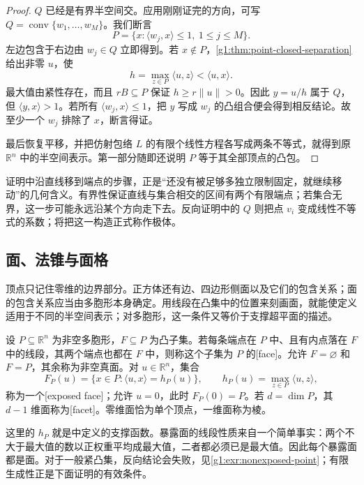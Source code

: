 \begin{proof}
	\(Q\) 已经是有界半空间交。应用刚刚证完的方向，可写 \(Q=\operatorname{conv}\{w_1,\ldots,w_M\}\)。我们断言
	\[
		P=\{x:\langle w_j,x\rangle\le1,\ 1\le j\le M\}.
	\]
	左边包含于右边由 \(w_j\in Q\) 立即得到。若 \(x\notin P\)，\cref{g1:thm:point-closed-separation}给出非零 \(u\)，使
	\[
		h=\max_{z\in P}\langle u,z\rangle<\langle u,x\rangle.
	\]
	最大值由紧性存在，而且 \(rB\subseteq P\) 保证 \(h\ge r\lVert u\rVert>0\)。因此 \(y=u/h\) 属于 \(Q\)，但 \(\langle y,x\rangle>1\)。若所有 \(\langle w_j,x\rangle\le1\)，把 \(y\) 写成 \(w_j\) 的凸组合便会得到相反结论。故至少一个 \(w_j\) 排除了 \(x\)，断言得证。

	最后恢复平移，并把仿射包络 \(L\) 的有限个线性方程各写成两条不等式，就得到原 \(\mathbb R^n\) 中的半空间表示。第一部分随即还说明 \(P\) 等于其全部顶点的凸包。
\end{proof}

证明中沿直线移到端点的步骤，正是“还没有被足够多独立限制固定，就继续移动”的几何含义。有界性保证直线与集合相交的区间有两个有限端点；若集合无界，这一步可能永远沿某个方向走下去。反向证明中的 \(Q\) 则把点 \(v_i\) 变成线性不等式的系数；将把这一构造正式称作极体。

\subsection{面、法锥与面格}
\label{g1:subsec:0303:03}

顶点只记住零维的边界部分。正方体还有边、四边形侧面以及它们的包含关系；面的包含关系应当由多胞形本身确定。用线段在凸集中的位置来刻画面，就能使定义适用于不同的半空间表示；对多胞形，这一条件又等价于支撑超平面的描述。

\begin{definition}
	\label{g1:def:polytope-face}
	设 \(P\subseteq\mathbb R^n\) 为非空多胞形，\(F\subseteq P\) 为凸子集。若每条端点在 \(P\) 中、且有内点落在 \(F\) 中的线段，其两个端点也都在 \(F\) 中，则称这个子集为 \(P\) 的[face]。允许 \(F=\varnothing\) 和 \(F=P\)，其余称为非空真面。对 \(u\in\mathbb R^n\)，集合
	\[
		F_P(u)=\{x\in P:\langle u,x\rangle=h_P(u)\},\qquad h_P(u)=\max_{z\in P}\langle u,z\rangle,
	\]
	称为一个[exposed face]；允许 \(u=0\)，此时 \(F_P(0)=P\)。若 \(d=\dim P\)，其 \(d-1\) 维面称为[facet]。零维面恰为单个顶点，一维面称为棱。
\end{definition}

这里的 \(h_P\) 就是中定义的支撑函数。暴露面的线段性质来自一个简单事实：两个不大于最大值的数以正权重平均成最大值，二者都必须已是最大值。因此每个暴露面都是面。对于一般紧凸集，反向结论会失败，见\cref{g1:exr:nonexposed-point}；有限生成性正是下面证明的有效条件。

